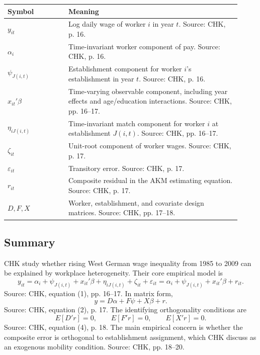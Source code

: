 \documentclass[11pt]{article}
\begin{document}
\begin{center}
\begin{tabular}{>{\raggedright\arraybackslash}p{0.24\linewidth}
                >{\raggedright\arraybackslash}p{0.68\linewidth}}
\toprule
Symbol & Meaning \\
\midrule
$y_{it}$ & Log daily wage of worker $i$ in year $t$. Source: CHK, p. 16. \\
$\alpha_i$ & Time-invariant worker component of pay. Source: CHK, p. 16. \\
$\psi_{J(i,t)}$ & Establishment component for worker $i$'s establishment in year $t$. Source: CHK, p. 16. \\
$x_{it}'\beta$ & Time-varying observable component, including year effects and age/education interactions. Source: CHK, pp. 16--17. \\
$\eta_{iJ(i,t)}$ & Time-invariant match component for worker $i$ at establishment $J(i,t)$. Source: CHK, pp. 16--17. \\
$\zeta_{it}$ & Unit-root component of worker wages. Source: CHK, p. 17. \\
$\varepsilon_{it}$ & Transitory error. Source: CHK, p. 17. \\
$r_{it}$ & Composite residual in the AKM estimating equation. Source: CHK, p. 17. \\
$D,F,X$ & Worker, establishment, and covariate design matrices. Source: CHK, pp. 17--18. \\
\bottomrule
\end{tabular}
\end{center}

\subsection{Summary}

CHK study whether rising West German wage inequality from 1985 to 2009 can be
explained by workplace heterogeneity. Their core empirical model is
\[
y_{it}
=
\alpha_i+\psi_{J(i,t)}+x_{it}'\beta+\eta_{iJ(i,t)}+\zeta_{it}+\varepsilon_{it}
=
\alpha_i+\psi_{J(i,t)}+x_{it}'\beta+r_{it}.
\]
Source: CHK, equation (1), pp. 16--17. In matrix form,
\[
y=D\alpha+F\psi+X\beta+r.
\]
Source: CHK, equation (2), p. 17. The identifying orthogonality conditions are
\[
E[D'r]=0,\qquad E[F'r]=0,\qquad E[X'r]=0.
\]
Source: CHK, equation (4), p. 18. The main empirical concern is whether the
composite error is orthogonal to establishment assignment, which CHK discuss as
an exogenous mobility condition. Source: CHK, pp. 18--20.
\end{document}
